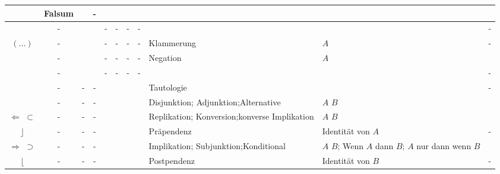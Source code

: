\begin{table}[p]
\begin{threeparttable}
\begin{tabularx}{\linewidth}{|c||c:cc:cccc|X:X|c|}
			& Falsum
			&  & - \\
			\hline\hline%
			& - & \texttrue & \texttrue  & - & - & - & - & & & - \\
			\tableline%
			$(\dots)$
			& - & \texttrue & \textfalse & - & - & - & -
			& Klammerung
			& $A$  & - \\
			\tableline%
			& - & \textfalse & \texttrue  & - & - & - & -
			& Negation
			&  $A$ & \thepnot{} \\
			\tableline%
			& - & \textfalse & \textfalse & - & - & - & - & & & -  \\
			\hline\hline%
			& - & - & - &\texttrue&\texttrue&\texttrue&\texttrue
			& Tautologie
			& & - \\
			\tableline%
			\defSym{\OjkOr}
			& - & - & - &\texttrue&\texttrue&\texttrue&\textfalse
			& Disjunktion; Adjunktion;\newline Alternative
			& $A$  $B$ & \thepor \\
			\tableline%
			 $\Leftarrow$ $\subset$
			& - & - & - &\texttrue&\texttrue&\textfalse&\texttrue
			& Replikation; Konversion;\newline konverse Implikation
			& $A$  $B$ & \theprep \\
			\tableline%
			$\rfloor$
			& - & - & - &\texttrue&\texttrue&\textfalse&\textfalse
			& Präpendenz
			& Identität von $A$ & - \\
			\tablegroup%
			 $\Rightarrow$ $\supset$
			& - & - & - &\texttrue&\textfalse&\texttrue&\texttrue
			& Implikation; Subjunktion;\newline Konditional
			&  $A$  $B$; Wenn $A$ dann $B$;\newline
			$A$ nur dann wenn $B$ & \thepimp \\
			\tableline%
			$\lfloor$
			& - & - & - &\texttrue&\textfalse&\texttrue&\textfalse
			& Postpendenz
			& Identität von $B$ & - \\

\end{tabularx}
\end{threeparttable}
\end{table}
